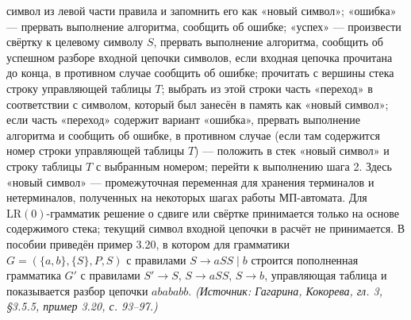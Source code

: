 \documentclass[a4paper,12pt]{article}
\begin{document}
символ из левой части правила и запомнить его как «новый символ»; «ошибка» — прервать выполнение алгоритма, сообщить об ошибке; «успех» — произвести свёртку к целевому символу \(S\), прервать выполнение алгоритма, сообщить об успешном разборе входной цепочки символов, если входная цепочка прочитана до конца, в противном случае сообщить об ошибке; прочитать с вершины стека строку управляющей таблицы \(T\); выбрать из этой строки часть «переход» в соответствии с символом, который был занесён в память как «новый символ»; если часть «переход» содержит вариант «ошибка», прервать выполнение алгоритма и сообщить об ошибке, в противном случае (если там содержится номер строки управляющей таблицы \(T\)) — положить в стек «новый символ» и строку таблицы \(T\) с выбранным номером; перейти к выполнению шага 2. Здесь «новый символ» — промежуточная переменная для хранения терминалов и нетерминалов, полученных на некоторых шагах работы МП-автомата. Для \(\mathrm{LR}(0)\)-грамматик решение о сдвиге или свёртке принимается только на основе содержимого стека; текущий символ входной цепочки в расчёт не принимается. В пособии приведён пример 3.20, в котором для грамматики \(G=(\{a,b\},\{S\},P,S)\) с правилами \(S\to aSS\mid b\) строится пополненная грамматика \(G'\) с правилами \(S'\to S\), \(S\to aSS\), \(S\to b\), управляющая таблица и показывается разбор цепочки \(abababb\).
\textit{(Источник: Гагарина, Кокорева, гл. 3, §3.5.5, пример 3.20, с. 93--97.)}
\end{document}
